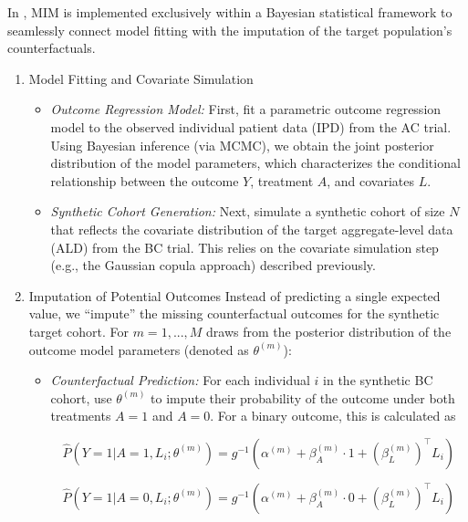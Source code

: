 \documentclass[article]{jss}
\begin{document}
In , MIM is implemented exclusively within a Bayesian statistical framework to seamlessly connect model fitting with the imputation of the target population's counterfactuals.

\begin{enumerate}
\item Model Fitting and Covariate Simulation
\begin{itemize}
    \item \emph{Outcome Regression Model:} First, fit a parametric outcome regression model to the observed individual patient data (IPD) from the AC trial. Using Bayesian inference (via MCMC), we obtain the joint posterior distribution of the model parameters, which characterizes the conditional relationship between the outcome $Y$, treatment $A$, and covariates $L$.
    \item \emph{Synthetic Cohort Generation:} Next, simulate a synthetic cohort of size $N$ that reflects the covariate distribution of the target aggregate-level data (ALD) from the BC trial. This relies on the covariate simulation step (e.g., the Gaussian copula approach) described previously.
\end{itemize}

\item Imputation of Potential Outcomes
Instead of predicting a single expected value, we ``impute'' the missing counterfactual outcomes for the synthetic target cohort. For $m=1, ..., M$ draws from the posterior distribution of the outcome model parameters (denoted as $\theta^{(m)}$):
\begin{itemize}
    \item \emph{Counterfactual Prediction:} For each individual $i$ in the synthetic BC cohort, use $\theta^{(m)}$ to impute their probability of the outcome under both treatments $A=1$ and $A=0$. For a binary outcome, this is calculated as

$$
\hat{P}(Y=1|A=1,L_i;\theta^{(m)}) = g^{-1}(\alpha^{(m)} + \beta_A^{(m)}\cdot 1 + (\beta_L^{(m)})^\top L_i)
$$

$$
\hat{P}(Y=1|A=0,L_i;\theta^{(m)}) = g^{-1}(\alpha^{(m)} + \beta_A^{(m)}\cdot 0 + (\beta_L^{(m)})^\top L_i)
$$
\end{itemize}


\end{enumerate}
\end{document}
